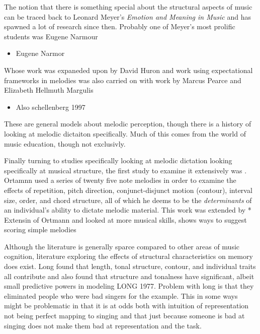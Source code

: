 \documentclass[]{book}
\providecommand{\tightlist}{%
  \setlength{\itemsep}{0pt}\setlength{\parskip}{0pt}}
\theoremstyle{definition}
\theoremstyle{definition}
\theoremstyle{definition}
\theoremstyle{remark}
\begin{document}
The notion that there is something special about the structural aspects
of music can be traced back to Leonard Meyer's \emph{Emotion and Meaning
in Music} \citep{meyerEmotionMeaningMusic1956} and has spawned a lot of
research since then. Probably one of Meyer's most prolific students was
Eugene Narmour

\begin{itemize}
\tightlist
\item
  Eugene Narmor
  \citep{narmourAnalysisCognitionBasic1990, narmourAnalysisCognitionMelodic1992}
\end{itemize}

Whose work was expaneded upon by David Huron
\citep{huronSweetAnticipation2006} and work using expectational
frameworks in melodies was also carried on with work by Marcus Pearce
\citep{pearceAuditoryExpectationInformation2012} and Elizabeth Hellmuth
Margulis \citep{margulisModelMelodicExpectation2005}

\begin{itemize}
\tightlist
\item
  Also schellenberg 1997
  \citep{schellenbergSimplifyingImplicationRealizationModel1997}
\end{itemize}

These are general models about melodic perception, though there is a
history of looking at melodic dictaiton specifically. Much of this comes
from the world of music education, though not exclusivly.

Finally turning to studies specifically looking at melodic dictation
looking specifically at musical structure, the first study to examine it
extensively was \citep{ortmannTonalDeterminantsMelodic1933}. Ortamnn
used a series of twenty five note melodies in order to examine the
effects of repetition, pitch direction, conjunct-disjunct motion
(contour), interval size, order, and chord structure, all of which he
deems to be the \emph{determinants} of an individual's ability to
dictate melodic material. This work was extended by *
\citep{taylorStrategiesMemoryShort1983} Extensin of Ortmann and looked
at more musical skills, shows ways to suggest scoring simple melodies

Although the literature is generally sparce compared to other areas of
music cognition, literature exploring the effects of structural
characteristics on memory does exist. Long found that length, tonal
structure, contour, and individual traits all contribute and also found
that structure and tonalness have significant, albeit small predictive
powers in modeling LONG 1977. Problem with long is that they eliminated
people who were bad singers for the example. This in some ways might be
problematic in that it is at odds both with intuition of representation
not being perfect mapping to singing
\citep{pfordresherPoorPitchSingingAbsence2007} and that just because
someone is bad at singing does not make them bad at representation and
the task.
\end{document}
